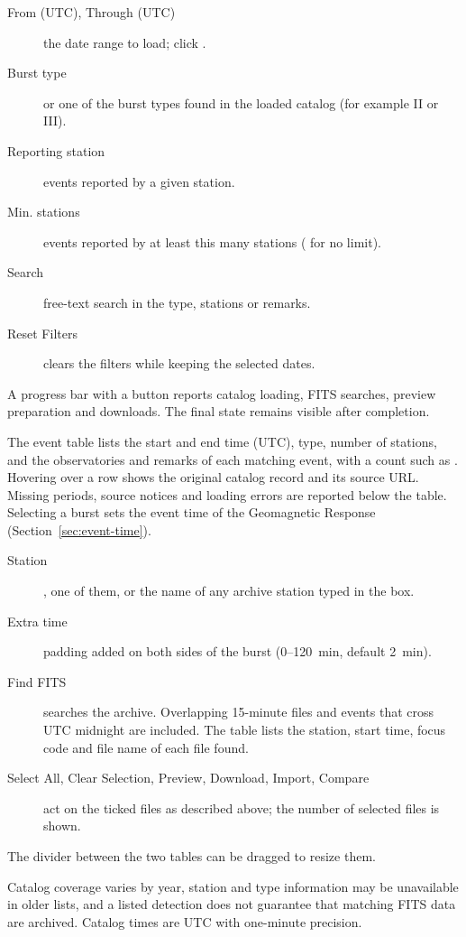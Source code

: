\begin{description}
  \item[From (UTC), Through (UTC)] the date range to load; click .
  \item[Burst type]  or one of the burst types found in the loaded catalog (for example II or III).
  \item[Reporting station] events reported by a given station.
  \item[Min. stations] events reported by at least this many stations ( for no
    limit).
  \item[Search] free-text search in the type, stations or remarks.
  \item[Reset Filters] clears the filters while keeping the selected dates.
\end{description}
A progress bar with a  button reports catalog loading, FITS searches, preview
preparation and downloads. The final state remains visible after completion.

The event table lists the start and end time (UTC), type, number of stations, and the
observatories and remarks of each matching event, with a count such as
. Hovering over a row shows the original catalog
record and its source URL. Missing periods, source notices and loading errors are reported
below the table. Selecting a burst sets the event time of the Geomagnetic Response
(Section~\ref{sec:event-time}).

\begin{description}
  \item[Station] , one of them, or the name of any archive
    station typed in the box.
  \item[Extra time] padding added on both sides of the burst (0--120~min, default 2~min).
  \item[Find FITS] searches the archive. Overlapping 15-minute files and events that cross
    UTC midnight are included. The table lists the station, start time, focus code and file
    name of each file found.
  \item[Select All, Clear Selection, Preview, Download, Import, Compare] act on the ticked
    files as described above; the number of selected files is shown.
\end{description}
The divider between the two tables can be dragged to resize them.

\begin{note}
  Catalog coverage varies by year, station and type information may be unavailable in
  older lists, and a listed detection does not guarantee that matching FITS data are
  archived. Catalog times are UTC with one-minute precision.
\end{note}
